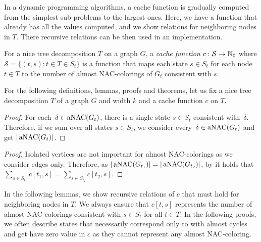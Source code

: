 In a dynamic programming algorithms, a cache function is gradually computed
from the simplest sub-problems to the largest ones.
Here, we have a function that already has all the values computed,
and we show relations for neighboring nodes in \( T \).
There recursive relations can be then used in an implementation.
%
\begin{definition}
	For a nice tree decomposition \( T \) on a graph \( G \),
	a \emph{cache function} \( c: \mathcal{S} \to \mathbb{N}_0 \)
	where \( \mathcal{S} = \{ (t,s): t \in T \in S_t \} \)
	is a function that maps each state \( s \in S_t \) for each node \( t \in T \)
	to the number of almost NAC-colorings of \( G_t \) consistent with \( s \).
\end{definition}
%
For the following definitions, lemmas, proofs and theorems, let us fix
a nice tree decomposition \( T \) of a graph \( G \) and width \( k \)
and a cache function \( c \) on \( T \).
%
%
\begin{proof}
	For each~\( \delta \in \operatorname{aNAC}(G_t) \),
	there is a single state \( s \in S_t \) consistent with~\( \delta \).
	Therefore, if we sum over all states \( s \in S_t \),
	we consider every~\( \delta \in \operatorname{aNAC}(G_t) \) and get \( |\operatorname{aNAC}(G_t)| \).
\end{proof}
%
%
\begin{proof}
	Isolated vertices are not important for almost NAC-colorings
	as we consider edges only.
	Therefore, as \( |\operatorname{aNAC}(G_{t_1})| = |\operatorname{aNAC}(G_{t_2})| \),
	by 
	it holds that \( \sum_{s \in S_{t_1}} c[t_1, s] = \sum_{s \in S_{t_2}} c[t_2, s] \).
\end{proof}
%

In the following lemmas, we show recursive relations of \( c \) that must hold
for neighboring nodes in \( T \).
We always ensure that \( c[t, s] \)
represents the number of almost NAC-colorings
consistent with \( s \in S_t \) for all \( t \in T  \).
%
In the following proofs,
we often describe states that necessarily correspond only
to \rbcol{} with almost cycles and
get have zero value in \( c \) as they cannot represent any almost NAC-coloring.

